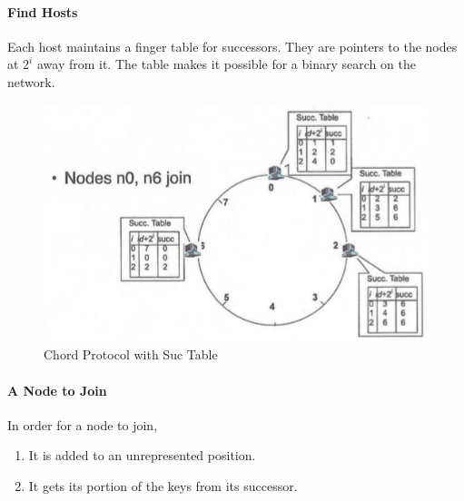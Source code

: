 \paragraph{Find Hosts}
Each host maintains a finger table for successors. They are pointers to the nodes at $2^i$ away from it. The table makes it possible for a binary search on the network.

\begin{figure}
\centering
\includegraphics[width=\textwidth]{img/ch05-chord-table.png}
\caption{Chord Protocol with Suc Table}
\label{fig:ch05-chord-table}
\end{figure}

\paragraph{A Node to Join}
In order for a node to join,
\begin{enumerate}
    \item It is added to an unrepresented position.
    \item It gets its portion of the keys from its successor.
\end{enumerate}